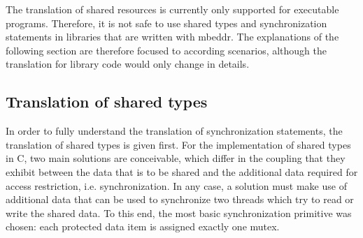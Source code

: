 The translation of shared resources is currently only supported for executable programs. Therefore, it is not safe to use shared types and synchronization statements in libraries that are written with mbeddr. The explanations of the following section are therefore focused to according scenarios, although the translation for library code would only change in details.

\subsection{Translation of shared types}
\label{sharedTypesTranslation}
In order to fully understand the translation of synchronization statements, the translation of shared types is given first. For the implementation of shared types in C, two main solutions are conceivable, which differ in the coupling that they exhibit between the data that is to be shared and the additional data required for access restriction, i.e. synchronization. In any case, a solution must make use of additional data that can be used to synchronize two threads which try to read or write the shared data. To this end, the most basic synchronization primitive was chosen: each protected data item is assigned exactly one mutex. 

